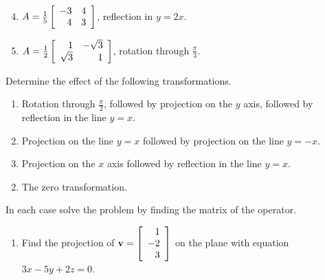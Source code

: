 \begin{multicols}{2}
\begin{ex}
\begin{sol}
\begin{enumerate}[label={\alph*.}]
\setcounter{enumi}{3}
\item $A = \tfrac{1}{5}\left[
\begin{array}{rr}
-3 & 4\\
4 & 3\\
\end{array}
\right]$, reflection in $y = 2x$.

\setcounter{enumi}{5}
\item  $A = \tfrac{1}{2}\left[
\begin{array}{rr}
1 & -\sqrt{3}\\
\sqrt{3} & 1\\
\end{array}
\right]$,
 rotation through $\frac{\pi}{3}$.

\end{enumerate}
\end{sol}
\end{ex}

\begin{ex}
Determine the effect of the following transformations.


\begin{enumerate}[label={\alph*.}]
\item Rotation through $\frac{\pi}{2}$, followed by projection on the $y$ axis, followed by reflection in the line $y = x$.

\item Projection on the line $y = x$ followed by projection on the line $y = -x$.

\item Projection on the $x$ axis followed by reflection in the line $y = x$.

\end{enumerate}
\begin{sol}
\begin{enumerate}[label={\alph*.}]
\setcounter{enumi}{1}
\item  The zero transformation.

\end{enumerate}
\end{sol}
\end{ex}

\begin{ex}
In each case solve the problem by finding the matrix of the operator.


\begin{enumerate}[label={\alph*.}]
\item Find the projection of 
$\textbf{v} = \left[
\begin{array}{r}
1\\
-2\\
3 
\end{array}
\right]$
 on the plane with equation $3x - 5y + 2z = 0$.


\end{enumerate}
\end{ex}
\end{multicols}
